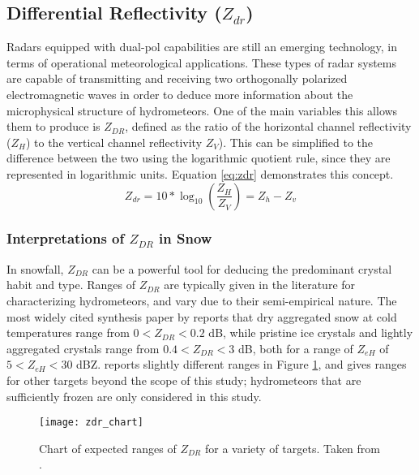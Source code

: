 \subsection{Differential Reflectivity ($Z_{dr}$)}
Radars equipped with dual-pol capabilities are still an emerging technology, in terms of operational meteorological applications. These
types of radar systems are capable of transmitting and receiving two orthogonally polarized electromagnetic waves in order to deduce more information about
the microphysical structure of hydrometeors. One of the main variables this allows them to produce is $Z_{DR}$, defined as the ratio of the horizontal
channel reflectivity ($Z_H$) to the vertical channel reflectivity $Z_{V}$). This can be simplified to the difference between the two using the logarithmic
quotient rule, since they are represented in logarithmic units. Equation \ref{eq:zdr} demonstrates this concept.
\begin{equation}\label{eq:zdr}
Z_{dr} = 10 * \log_{10}(\frac{Z_H}{Z_V}) = Z_h - Z_v
\end{equation}
\subsubsection{Interpretations of $Z_{DR}$ in Snow}
In snowfall, $Z_{DR}$ can be a powerful tool for deducing the predominant crystal habit and type. Ranges of $Z_{DR}$ are typically given in the literature for characterizing hydrometeors, and vary due to their semi-empirical nature. The most widely cited synthesis paper by \citet{Straka2000} reports that dry aggregated snow at cold temperatures range from $0 < Z_{DR} < 0.2$ dB, while pristine ice crystals and lightly aggregated crystals range from $0.4 < Z_{DR} < 3$ dB, both for a range of $Z_{eH}$ of $5 < Z_{eH} < 30$ dBZ. \citet{Fabry2015} reports slightly different ranges in Figure \ref{zdr_chart}, and gives ranges for other targets beyond the scope of this study; hydrometeors that are sufficiently frozen are only considered in this study.
\begin{figure}[H]
\texttt{[image: zdr\_chart]}
\caption{Chart of expected ranges of $Z_{DR}$ for a variety of targets. Taken from \citet{Fabry2015}.} 
\label{zdr_chart}
\end{figure}
